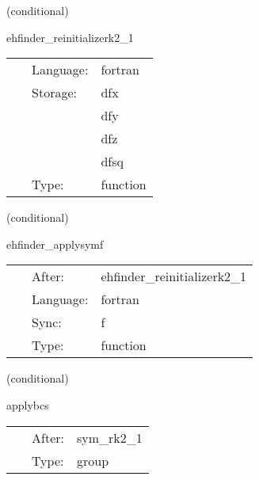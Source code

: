 \vspace{5mm}

   (conditional) 

\hspace{5mm} ehfinder\_reinitializerk2\_1 

\hspace{5mm}{\it rk2 scheme step 1 } 


\hspace{5mm}

 \begin{tabular*}{160mm}{cll} 
~ & Language:  & fortran \\ 
~ & Storage:  & dfx \\ 
~& ~ &dfy\\ 
~& ~ &dfz\\ 
~& ~ &dfsq\\ 
~ & Type:  & function \\ 
\end{tabular*} 


\vspace{5mm}

   (conditional) 

\hspace{5mm} ehfinder\_applysymf 

\hspace{5mm}{\it select f for boundary conditions } 


\hspace{5mm}

 \begin{tabular*}{160mm}{cll} 
~ & After:  & ehfinder\_reinitializerk2\_1 \\ 
~ & Language:  & fortran \\ 
~ & Sync:  & f \\ 
~ & Type:  & function \\ 
\end{tabular*} 


\vspace{5mm}

   (conditional) 

\hspace{5mm} applybcs 

\hspace{5mm}{\it apply boundary conditions (symmetries) } 


\hspace{5mm}

 \begin{tabular*}{160mm}{cll} 
~ & After:  & sym\_rk2\_1 \\ 
~ & Type:  & group \\ 
\end{tabular*} 


